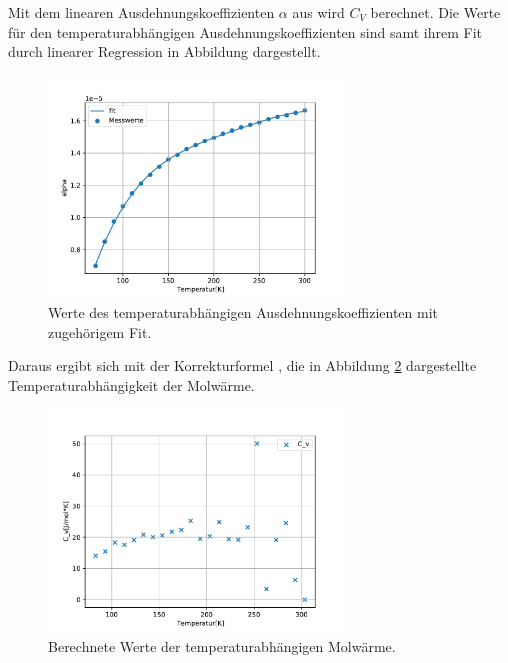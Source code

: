 Mit dem linearen Ausdehnungskoeffizienten $\alpha$ aus \cite*{sample} wird $C_V$ berechnet.
Die Werte für den temperaturabhängigen Ausdehnungskoeffizienten sind samt ihrem Fit durch linearer Regression in Abbildung  dargestellt.
\begin{figure}[h] 
  \centering
     \includegraphics[width=0.7\textwidth]{Auswertung/Plots/alpha.pdf}
  \caption{Werte des temperaturabhängigen Ausdehnungskoeffizienten mit zugehörigem Fit.}
  \label{fig:alpha}
\end{figure}
Daraus ergibt sich mit der Korrekturformel , die in Abbildung \ref{fig:C_v} dargestellte Temperaturabhängigkeit der Molwärme.
\begin{figure}[h] 
    \centering
       \includegraphics[width=0.7\textwidth]{Auswertung/Plots/C_v.pdf}
    \caption{Berechnete Werte der temperaturabhängigen Molwärme.}
    \label{fig:C_v}
\end{figure}



